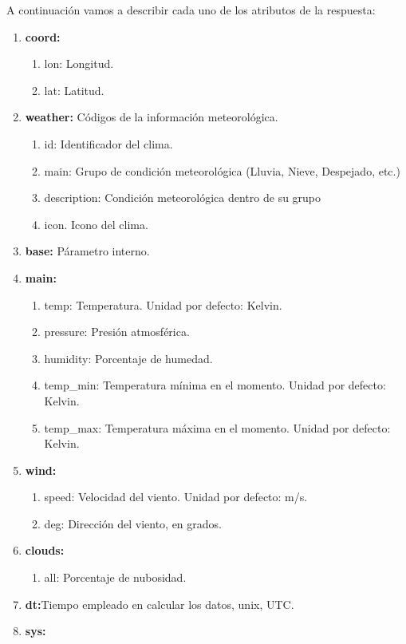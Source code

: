 A continuación vamos a describir cada uno de los atributos de la respuesta:

\begin{enumerate}
\item \textbf{coord:}
\begin{enumerate}
\item lon: Longitud.
\item lat: Latitud.
\end{enumerate}
\item \textbf{weather:} Códigos de la información meteorológica.
\begin{enumerate}
\item id: Identificador del clima.
\item main: Grupo de condición meteorológica (Lluvia, Nieve, Despejado, etc.)
\item description: Condición meteorológica dentro de su grupo
\item  icon. Icono del clima.
\end{enumerate}
\item  \textbf{base:} Párametro interno.
\item  \textbf{main:}
\begin{enumerate}
\item  temp: Temperatura. Unidad por defecto: Kelvin.
\item  pressure: Presión atmosférica.
\item  humidity: Porcentaje de humedad.
\item  temp\_min: Temperatura mínima en el momento. Unidad por defecto: Kelvin.
\item  temp\_max: Temperatura máxima en el momento. Unidad por defecto: Kelvin.
\end{enumerate}
\item  \textbf{wind:}
\begin{enumerate}
\item speed: Velocidad del viento. Unidad por defecto: m/s.
\item deg: Dirección del viento, en grados.
\end{enumerate}
\item  \textbf{clouds:}
\begin{enumerate}
\item all: Porcentaje de nubosidad.
\end{enumerate}
\item  \textbf{dt:}Tiempo empleado en calcular los datos, unix, UTC.
\item  \textbf{sys:}
\begin{enumerate}

\end{enumerate}
\end{enumerate}
